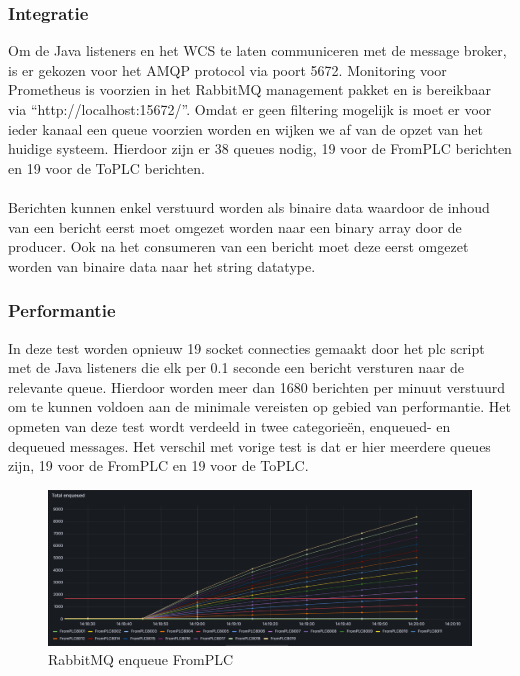 \subsubsection{Integratie}
Om de Java listeners en het WCS te laten communiceren met de message broker, is er gekozen voor het AMQP protocol via poort 5672.
Monitoring voor Prometheus is voorzien in het RabbitMQ management pakket en is bereikbaar via ``http://localhost:15672/''.
Omdat er geen filtering mogelijk is moet er voor ieder kanaal een queue voorzien worden en wijken we af van de opzet van het huidige systeem.
Hierdoor zijn er 38 queues nodig, 19 voor de FromPLC berichten en 19 voor de ToPLC berichten.
\\\\
Berichten kunnen enkel verstuurd worden als binaire data waardoor de inhoud van een bericht eerst moet omgezet worden naar een binary array door de producer.
Ook na het consumeren van een bericht moet deze eerst omgezet worden van binaire data naar het string datatype.

\subsubsection{Performantie}
In deze test worden opnieuw 19 socket connecties gemaakt door het plc script met de Java listeners die elk per 0.1 seconde een bericht versturen naar de relevante queue.
Hierdoor worden meer dan 1680 berichten per minuut verstuurd om te kunnen voldoen aan de minimale vereisten op gebied van performantie.
Het opmeten van deze test wordt verdeeld in twee categorieën, enqueued- en dequeued messages.
Het verschil met vorige test is dat er hier meerdere queues zijn, 19 voor de FromPLC en 19 voor de ToPLC. 

\begin{figure}[h!]
  \centering
  \includegraphics[width=.95\textwidth]{img/rabbitmq-enqueue-count-FromPLC.png}
  \caption{\label{fig:rabbitmq_enqueue_fromplc_count}RabbitMQ enqueue FromPLC}
\end{figure}

